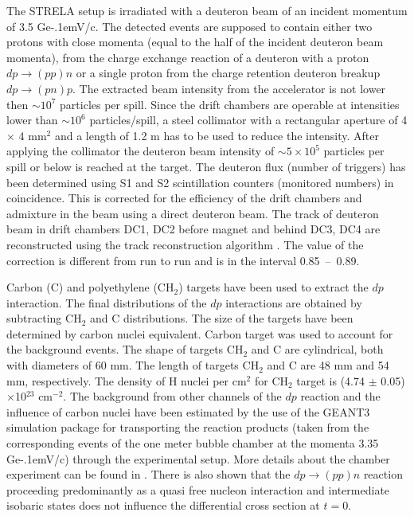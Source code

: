 \documentclass[twocolumn,epjc3]{svjour3}
\newcommand{\dpchex} {\ensuremath{dp \rightarrow (pp)n}\xspace}
\newcommand{\dpret}  {\ensuremath{dp \rightarrow (pn)p}\xspace}
\newcommand{\GeVc}   {Ge\kern-.1emV/c\xspace}
\begin{document}
The STRELA setup is irradiated with a deuteron beam of an incident momentum of
3.5 \GeVc. The detected events are supposed to contain either two protons with
close momenta (equal to the half of the incident deuteron beam momenta), from
the charge exchange reaction of a deuteron with a proton \dpchex or a single
proton from the charge retention deuteron breakup \dpret. The extracted beam
intensity from the accelerator is not lower then $\sim 10^{7}$ particles per
spill. Since the drift chambers are operable at intensities lower than
$\sim 10^{6}$ particles/spill, a steel collimator with a rectangular aperture of
4 $\times$ 4 mm$^2$ and a length of 1.2 m has to be used to reduce the
intensity. After applying the collimator the deuteron beam intensity of
$\sim 5\times10^5$ particles per spill or below is reached at the target. The
deuteron flux (number of triggers) has been determined using S1 and S2
scintillation counters (monitored numbers) in coincidence. This is corrected for
the efficiency of the drift chambers and admixture in the beam using a direct
deuteron beam. The track of deuteron beam in drift chambers DC1, DC2 before
magnet and behind DC3, DC4 are reconstructed using the track reconstruction
algorithm \cite{gla13}. The value of the correction is different from run to run
and is in the interval 0.85~--~0.89.

Carbon (C) and polyethylene (CH$_2$) targets have been used to extract the $dp$
interaction. The final distributions of the $dp$ interactions are obtained by
subtracting CH$_2$ and C distributions. The size of the targets have been
determined by carbon nuclei equivalent. Carbon target was used to account for
the background events. The shape of targets CH$_2$ and C are cylindrical, both
with diameters of 60 mm. The length of targets CH$_2$ and C are 48 mm and 54 mm,
respectively. The density of H nuclei per cm$^2$ for CH$_2$ target is (4.74
$\pm$ 0.05)$\times$10$^{23}$ cm$^{-2}$. The background from other channels of
the $dp$ reaction and the influence of carbon nuclei have been estimated by the
use of the GEANT3 simulation package for transporting the reaction products
(taken from the corresponding events of the one meter bubble chamber at the
momenta 3.35 \GeVc) through the experimental setup. More details about the
chamber experiment can be found in \cite{gla02,gla08}. There is also shown that
the \dpchex reaction proceeding predominantly as a quasi free nucleon
interaction and intermediate isobaric states does not influence the differential
cross section at $t = 0$.
\end{document}
